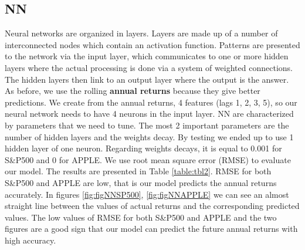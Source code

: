 \documentclass[letterpaper,12pt]{article}
\begin{document}
\subsection{NN}

Neural networks are organized in layers. Layers are made up of a number of interconnected nodes which contain an activation function. Patterns are presented to the network via the input layer, which communicates to one or more hidden layers where the actual processing is done via a system of weighted connections. The hidden layers then link to an output layer where the output is the answer. As before, we use the rolling \textbf{annual returns} because they give better predictions. We create from the annual returns, 4 features (lags 1, 2, 3, 5), so our neural network needs to have 4 neurons in the input layer. NN are characterized by parameters that we need to tune. The most 2 important parameters are the number of hidden layers and the weights decay. By testing we ended up to use 1 hidden layer of one neuron. Regarding weights decays, it is equal to 0.001 for S\&P500 and 0 for APPLE. We use root mean square error (RMSE) to evaluate our model. The results are presented in Table \ref{table:tbl2}. RMSE for both S\&P500 and APPLE are low, that is our model predicts the annual returns accurately. In figures \ref{fig:figNNSP500}, \ref{fig:figNNAPPLE} we can see an almost straight line between the values of actual returns and the corresponding predicted values. The low values of RMSE for both S\&P500 and APPLE and the two figures are a good sign that our model can predict the future annual returns with high accuracy.
\end{document}
